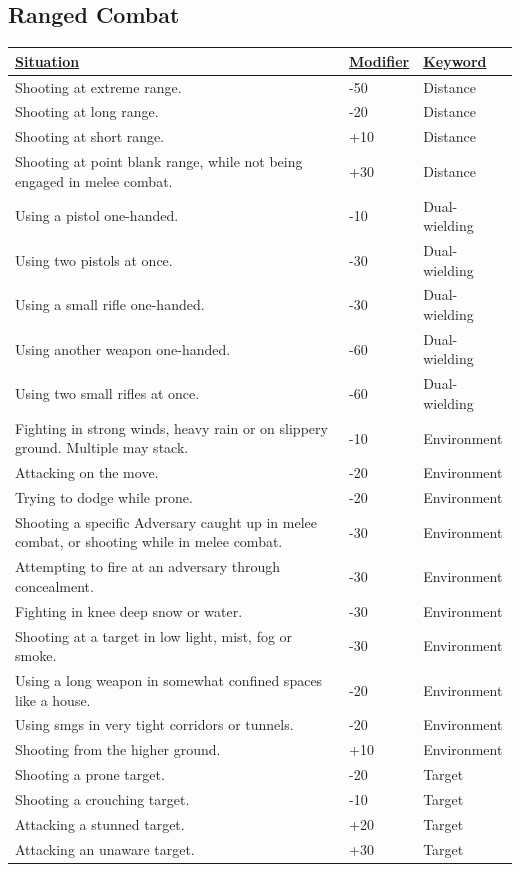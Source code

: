 \subsection{Ranged Combat}
\begin{tabularx}{\textwidth}{|X|l|l|}
	\hline
	\ul{Situation} & \ul{Modifier} & \ul{Keyword} \\ \hline
	Shooting at extreme range. & -50 & Distance \\ \hline
	Shooting at long range. & -20 & Distance \\ \hline
	Shooting at short range. & +10 & Distance \\ \hline
	Shooting at point blank range, while not being engaged in melee combat. & +30 & Distance \\ \hline
	Using a pistol one-handed. & -10 & Dual-wielding \\ \hline
	Using two pistols at once. & -30 & Dual-wielding \\ \hline
	Using a small rifle one-handed. & -30 & Dual-wielding \\ \hline
	Using another weapon one-handed. & -60 & Dual-wielding \\ \hline
	Using two small rifles at once. & -60 & Dual-wielding \\ \hline
	Fighting in strong winds, heavy rain or on slippery ground. Multiple may stack. & -10 & Environment \\ \hline
	Attacking on the move. & -20 & Environment \\ \hline
	Trying to dodge while prone. & -20 & Environment \\ \hline
	Shooting a specific Adversary caught up in melee combat, or shooting while in melee combat. & -30 & Environment \\ \hline
	Attempting to fire at an adversary through concealment. & -30 & Environment \\ \hline
	Fighting in knee deep snow or water. & -30 & Environment \\ \hline
	Shooting at a target in low light, mist, fog or smoke. & -30 & Environment \\ \hline
	Using a long weapon in somewhat confined spaces like a house. & -20 & Environment \\ \hline
	Using smgs in very tight corridors or tunnels. & -20 & Environment \\ \hline
	Shooting from the higher ground. & +10 & Environment \\ \hline
	Shooting a prone target. & -20 & Target \\ \hline
	Shooting a crouching target. & -10 & Target \\ \hline
	Attacking a stunned target. & +20 & Target \\ \hline
	Attacking an unaware target. & +30 & Target \\ \hline
\end{tabularx}

